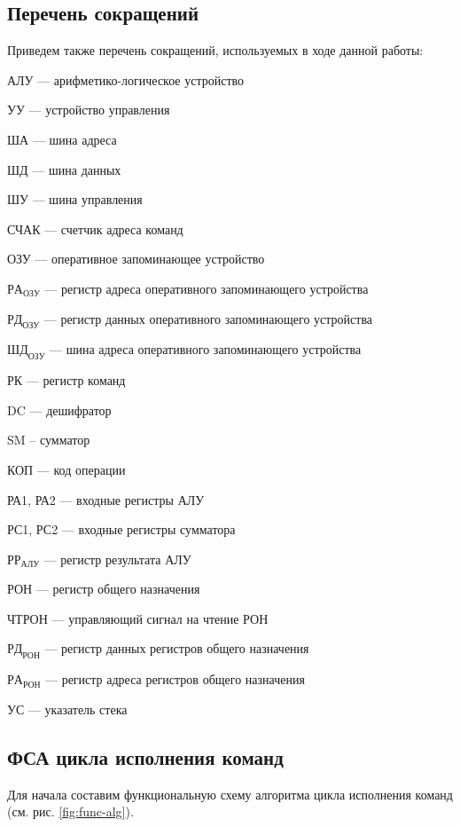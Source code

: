 \documentclass[a4paper,14pt]{extarticle}
\begin{document}
\subsection{Перечень сокращений}
Приведем также перечень сокращений, используемых в ходе данной работы:

АЛУ --- арифметико-логическое устройство

УУ --- устройство управления

ША --- шина адреса

ШД --- шина данных

ШУ --- шина управления

СЧАК --- счетчик адреса команд

ОЗУ  --- оперативное запоминающее устройство

$РА_{ОЗУ}$ --- регистр адреса оперативного запоминающего устройства

$РД_{ОЗУ}$ --- регистр данных оперативного запоминающего устройства

$ШД_{ОЗУ}$ --- шина адреса оперативного запоминающего устройства

РК  --- регистр команд


DC  --- дешифратор

SM -- сумматор

КОП --- код операции

РА1, РА2 --- входные регистры АЛУ

РС1, РС2 --- входные регистры сумматора

$РР_{АЛУ}$ --- регистр результата АЛУ

РОН --- регистр общего назначения

ЧТРОН --- управляющий сигнал на чтение РОН

$РД_{РОН}$  --- регистр данных регистров общего назначения

$РА_{РОН}$  --- регистр адреса регистров общего назначения

УС --- указатель стека


\subsection{ФСА цикла исполнения команд}

Для начала составим функциональную схему алгоритма цикла исполнения команд (см. рис. \ref{fig:func-alg}).
\end{document}
